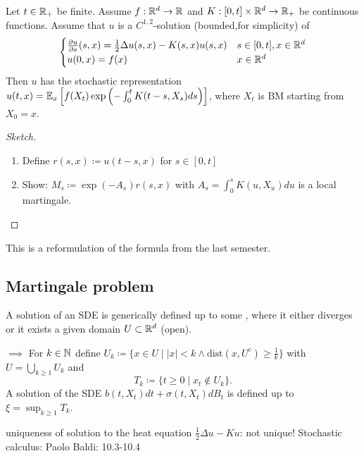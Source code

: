 \begin{example}\label{ex1.16:feynman-kac}
    Let $t\in\mathbb{R}_+$ be finite. Assume $f:\mathbb{R}^d\to\mathbb{R}$ and $K:[0,t]\times\mathbb{R}^d\to\mathbb{R}_+$ 
    be continuous functions. Assume that $u$ is a $C^{1,2}$-solution (bounded,for simplicity) of 
    \[\begin{cases}
        \frac{\partial u}{\partial s}(s,x)=\frac{1}{2}\Delta u(s,x)-K(s,x)u(s,x) & s\in [0,t],x\in\mathbb{R}^d\\
        u(0,x)=f(x)& x\in\mathbb{R}^d
    \end{cases}\]
    Then $u$ has the stochastic representation $u(t,x)=\mathbb{E}_x\left[f(X_t)\exp\left(-\int_0^t K(t-s,X_s)ds\right)\right]$,
    where $X_t$ is BM starting from $X_0=x$.
\end{example}

\begin{proof}[Sketch]
    \begin{enumerate}
        \item Define $r(s,x)\coloneqq u(t-s,x)$ for $s\in[0,t]$
        \item Show: $M_s\coloneqq \exp(-A_s)r(s,x)$ with $A_s=\int_0^s K(u,X_u)du$ is a local martingale.
    \end{enumerate}
\end{proof}

\begin{remark}
    This is a reformulation of the formula from the last semester.
\end{remark}

\subsection{Martingale problem}

A solution of an SDE is generically defined up to some ,
where it either diverges or it exists a given domain $U\subset\mathbb{R}^d$ (open).

$\implies$ For $k\in\mathbb{N}$ define $U_k\coloneqq \{x\in U\mid |x|<k\land \text{dist}(x,U^c)\geq \frac{1}{k}\}$
with $U=\bigcup_{k\geq 1} U_k$ and 
\[T_k\coloneqq \{t\geq 0\mid x_t\notin U_k\}.\]
A solution of the SDE $b(t,X_t)dt+ \sigma(t,X_t)dB_t$ is defined up to $\xi=\sup_{k\geq 1} T_k$.



\begin{aremark}
    uniqueness of solution to the heat equation $\frac{1}{2}\Delta u -Ku$: not unique!
    Stochastic calculus: Paolo Baldi: 10.3-10.4
\end{aremark}


